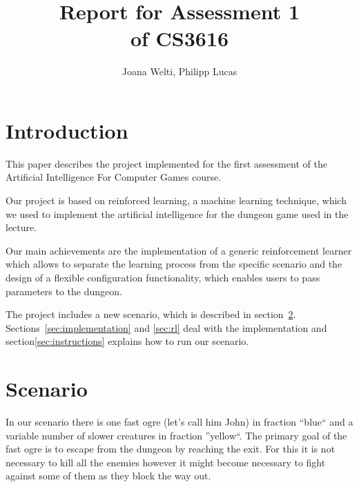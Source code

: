 \documentclass[a4paper,10pt]{scrartcl}
\title{Report for Assessment 1 \\ \large{of CS3616}}
\author{Joana Welti, Philipp Lucas}
\begin{document}

\maketitle
\newpage

\tableofcontents

\newpage


\section{Introduction}
This paper describes the project implemented for the first assessment of the Artificial Intelligence For Computer Games course.

Our project is based on reinforced learning, a machine learning technique, which we used to implement the artificial intelligence for the dungeon game used in the lecture.

Our main achievements are the implementation of a generic reinforcement learner which allows to separate the learning process from the specific scenario and the design of a flexible configuration functionality, which enables users to pass parameters to the dungeon.

The project includes a new scenario, which is described in section~\ref{sec:scenario}. Sections~\ref{sec:implementation} and \ref{sec:rl} deal with the implementation and section\ref{sec:instructions} explains how to run our scenario.
 
\section{Scenario}\label{sec:scenario}
In our scenario there is one fast ogre (let's call him John) in fraction ``blue`` and a variable number of slower creatures in fraction ''yellow``. The primary goal of the fast ogre is to escape from the dungeon by reaching the exit. For this it is not necessary to kill all the enemies however it might become necessary to fight against some of them as they block the way out.
\end{document}
